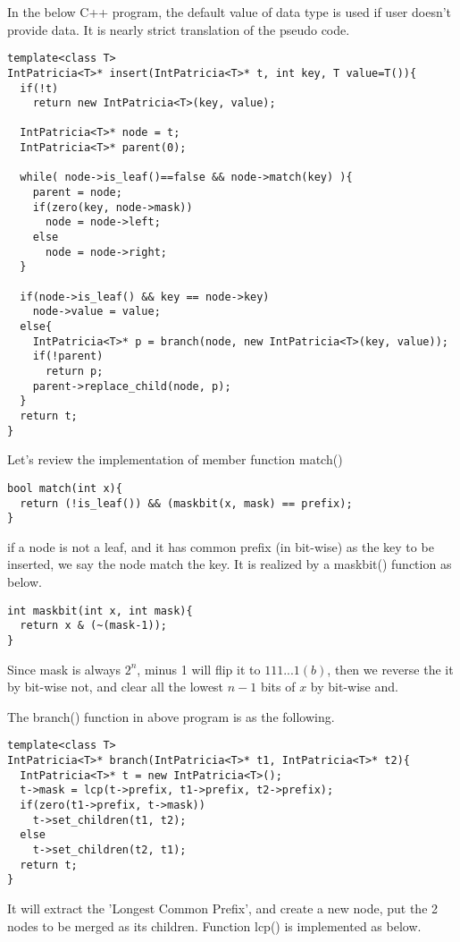 \documentclass{article}
\begin{document}
In the below C++ program, the default value of data type is used if user
doesn't provide data. It is nearly strict translation of the pseudo code.

\lstset{language=C++}
\begin{lstlisting}
template<class T>
IntPatricia<T>* insert(IntPatricia<T>* t, int key, T value=T()){
  if(!t)
    return new IntPatricia<T>(key, value);

  IntPatricia<T>* node = t;
  IntPatricia<T>* parent(0);

  while( node->is_leaf()==false && node->match(key) ){
    parent = node;
    if(zero(key, node->mask))
      node = node->left;
    else
      node = node->right;
  }

  if(node->is_leaf() && key == node->key)
    node->value = value;
  else{
    IntPatricia<T>* p = branch(node, new IntPatricia<T>(key, value));
    if(!parent)
      return p;
    parent->replace_child(node, p);
  }
  return t;
}
\end{lstlisting}

Let's review the implementation of member function match()

\begin{lstlisting}
bool match(int x){
  return (!is_leaf()) && (maskbit(x, mask) == prefix);
}
\end{lstlisting}

if a node is not a leaf, and it has common prefix (in bit-wise) as the key
to be inserted, we say the node match the key. It is realized by a maskbit()
function as below.

\begin{lstlisting}
int maskbit(int x, int mask){
  return x & (~(mask-1));
}
\end{lstlisting}

Since mask is always $2^n$, minus 1 will flip it to $111...1(b)$, then
we reverse the it by bit-wise not, and clear all the lowest $n-1$ bits of
$x$ by bit-wise and.

The branch() function in above program is as the following.

\begin{lstlisting}
template<class T>
IntPatricia<T>* branch(IntPatricia<T>* t1, IntPatricia<T>* t2){
  IntPatricia<T>* t = new IntPatricia<T>();
  t->mask = lcp(t->prefix, t1->prefix, t2->prefix);
  if(zero(t1->prefix, t->mask))
    t->set_children(t1, t2);
  else
    t->set_children(t2, t1);
  return t;
}
\end{lstlisting}

It will extract the 'Longest Common Prefix', and create a new node, put
the 2 nodes to be merged as its children. Function lcp() is implemented
as below.
\end{document}
